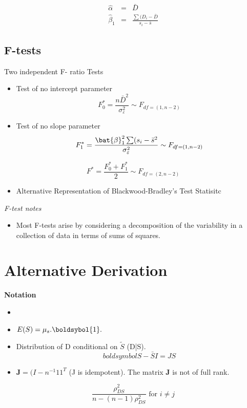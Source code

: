 \documentclass[12pt]{article}
\begin{document}
\begin{eqnarray}
\hat{\alpha} &=& \bar{D} \\
\hat{\beta}_1 &=& \frac{\sum(D_i - \bar{D}}{s_i - \bar{s}}
\end{eqnarray}
\newpage
\subsection{F-tests}

Two independent F- ratio Tests

\begin{itemize}
\item Test of no intercept parameter
\[ F^{\ast}_0 = \frac{n\bar{D}^2}{\sigma^2_\varepsilon} \sim F_{df = (1,n-2)}\]

\item Test of no slope parameter
\[ F^{\ast}_1 = \frac{ \bat{\beta}^2_1\sum(s_i-\bar{s}^2}{\sigma^2_\varepsilon} \sim F_{df = (1,n-2)}\]
\end{itemize}

\[ F^{\ast}  = \frac{F^{\ast}_0 + F^{\ast}_1 }{2} \sim F_{df = (2,n-2)}\]
\begin{itemize}
\item Alternative Representation of Blackwood-Bradley's Test Statisitc
\end{itemize}
\textit{F-test notes}
\begin{itemize}
\item Most F-tests arise by considering a decomposition of the variability in a collection of data in terms of sums of squares. 
\end{itemize}
\section{Alternative Derivation}
\textbf{Notation}
\begin{itemize}
\item
\item $ E(S) = \mu_s.\boldsybol{1}.$
\item Distribution of D conditional on $\tilde{S}$ (D|S).
\[boldsymbol{S} - \bar{S}I = JS\]
\item $\boldsymbol{J} = (I - n^{-1}11^{T}$ (J is idempotent). The matrix $\boldsymbol{J}$ is not of full rank.

\end{itemize}


\[ \frac{ \rho^2_{DS} }{ n- (n-1)\rho^2_{DS}  }  \mbox{ for } i \neq j\]


\end{document}
